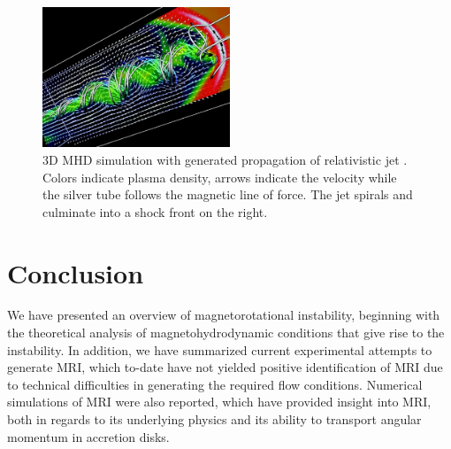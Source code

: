 \documentclass{jfm}
\begin{document}
\begin{figure}
    \centering
    \includegraphics[width=0.5\textwidth]{Meier2001}
    \caption{3D MHD simulation with generated propagation of relativistic jet \citep{Meier2001}. Colors indicate plasma density, arrows indicate the velocity while the silver tube follows the magnetic line of force. The jet spirals and culminate into a shock front on the right.}
    \label{fig:Meier2001}
\end{figure}



\section{Conclusion}
We have presented an overview of magnetorotational instability, beginning with
the theoretical analysis of magnetohydrodynamic conditions that give rise to
the instability. In addition, we have summarized current experimental attempts
to generate MRI, which to-date have not yielded positive identification of MRI
due to technical difficulties in generating the required flow conditions.
Numerical simulations of MRI were also reported, which have provided insight
into MRI, both in regards to its underlying physics and its ability to
transport angular momentum in accretion disks.





\end{document}
